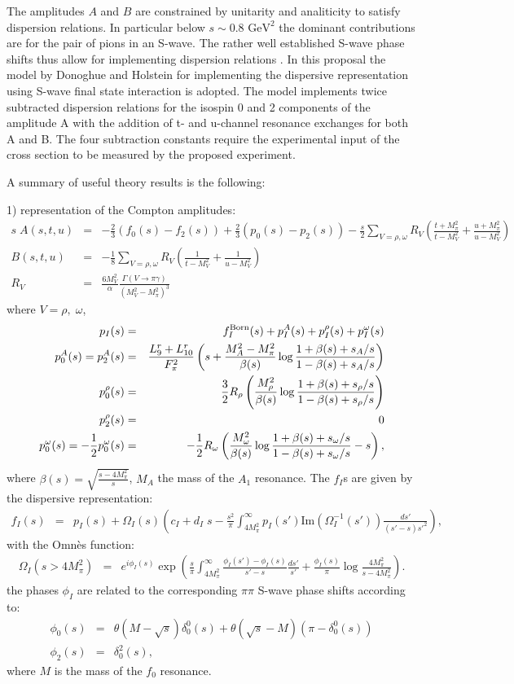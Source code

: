 \documentclass[12pt]{article}
\newcommand{\bea}{\begin{eqnarray}}
\newcommand{\eea}{\end{eqnarray}}
\begin{document}
The amplitudes $A$ and $B$ are constrained by unitarity and analiticity to satisfy dispersion relations. In particular below $s\sim 0.8\text{ GeV}^2$ the dominant contributions are for the pair of pions in an S-wave. The rather well established S-wave phase shifts thus allow for implementing  dispersion relations \cite{Donoghue:1993kw, Oller:2008kf,Moussallam:2013una,Dai:2014zta,Dai:2014lza,Dai:2016ytz}.  In this proposal the model by Donoghue and Holstein \cite{Donoghue:1993kw} for implementing the dispersive representation using S-wave final state interaction is adopted. The model implements   twice subtracted dispersion relations for the isospin 0 and 2 components of the  amplitude A with the addition of t- and u-channel resonance exchanges for both A and B. The four subtraction constants require the experimental input of the cross section to be measured by the proposed experiment. 

A summary of useful  theory results is the following:  

1) representation of the Compton amplitudes:
\bea
s\;A(s,t,u)&=& -\frac 23(f_0(s)-f_2(s))+\frac 23 (p_0(s)-p_2(s))-\frac s 2\sum_{V=\rho,\omega} R_V (\frac{t+M_\pi^2}{t-M_V^2}+\frac{u+M_\pi^2}{u-M_V^2})\nonumber\\
B(s,t,u)&=&-\frac 18 \sum_{V=\rho,\omega} R_V (\frac{1}{t-M_V^2}+\frac{1}{u-M_V^2})\nonumber\\
R_V&=&\frac{6 M_V^2}{\alpha} \frac{\Gamma(V\to \pi \gamma)}{(M_V^2-M_\pi^2)^3}
\eea
where $V=\rho,\;\omega$, 
\bea
p_I(s)&=& f_I^{\rm Born}(s)+p_I^A(s)+p^\rho_I(s)+p_I^\omega(s)\nonumber\\
p_0^A(s)=p_2^A(s)&=&\frac{L_9^r+L_{10}^r}{F_\pi^2}\left(s+\frac{M_A^2-M_\pi^2}{\beta(s)}\log\frac{1+\beta(s)+s_A/s}{1-\beta(s)+s_A/s}\right)\nonumber\\
p_0^\rho(s)&=&\frac 32 R_\rho\left( \frac{M_\rho^2}{\beta(s)}  \log\frac{1+\beta(s)+s_\rho/s}{1-\beta(s)+s_\rho/s}\right)\nonumber\\
p_2^\rho(s)&=&0\nonumber\\
p_0^\omega(s)=-\frac 12 p_0^\omega(s)&=&-\frac 12 R_\omega\left( \frac{M_\omega^2}{\beta(s)}  \log\frac{1+\beta(s)+s_\omega/s}{1-\beta(s)+s_\omega/s}-s\right),
\eea
where $\beta(s)=\sqrt{\frac{s-4 M_\pi^2}{s}}$, $M_A$ the mass of the $A_1$ resonance. The $f_I$s are given by the dispersive representation:
\bea
f_I(s)&=& p_I(s)+\Omega_I(s)\left(c_I+d_I\;s-\frac{s^2}{\pi} \int_{4M_\pi^2}^\infty p_I(s') \text{Im}(\Omega_I^{-1}(s'))\frac {ds'} {(s'-s) s'^2}\right),
\eea
with the Omn\`es function:
\bea\Omega_I(s>4 M_\pi^2)&=&e^{i\phi_I(s)} \exp\left(\frac s\pi\int_{4 M_\pi^2}^\infty \frac{\phi_I(s')-\phi_I(s)}{s'-s} \frac{ds'}{s'}+\frac{\phi_I(s)}{\pi}\log\frac{4M_\pi^2}{s-4M_\pi^2}\right).
\eea
the phases $\phi_I$ are related to the corresponding $\pi\pi$ S-wave phase shifts according to:
\bea
\phi_0(s)&=&\theta(M-\sqrt{s}) \delta_0^0(s)+\theta( \sqrt{s}-M)(\pi-\delta_0^0(s))\nonumber\\
\phi_2(s)&=&\delta_0^2(s),
\eea
where $M$ is the mass of the $f_0$ resonance.  
\end{document}
